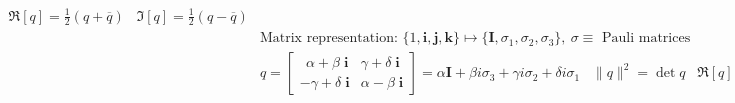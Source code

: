 \begin{align*}
\Re[q]= \!\tfrac{1}{2} (q+\overline{q})\; \; \; \Im [q]= \!\tfrac{1}{2} (q-\overline{q})\\
&\text{Matrix representation: } \{1,\mathbf{i}, \mathbf{j}, \mathbf{k}\}\mapsto  \{\mathbf{I}, \sigma_1, \sigma_2, \sigma_3\}, \ \sigma \equiv\text{ Pauli matrices}\\
&q\!=\!\!\begin{bmatrix}\ \ \alpha\!+\!\beta\;\!\mathbf{i}\!& \!\gamma \!+\!\delta \;\! \mathbf{i}\\
-\gamma \!+\! \delta \;\!\mathbf{i} \!&\!
\alpha\!-\!\beta\;\! \mathbf{i}
\end{bmatrix} \!\!=\! \alpha\mathbf{I}\!+\!\beta i\sigma_3 \!+\! \gamma i \sigma_2 \!+\! \delta i \sigma_1\; \; \;
\|q\|^2\! \! = \!\det q \; \; \; \Re [q]\! = \!\tfrac{1}{2}\! \operatorname{tr}q\; \; \;\overline{q}\!=\! q^{\dagger}
\end{align*}




